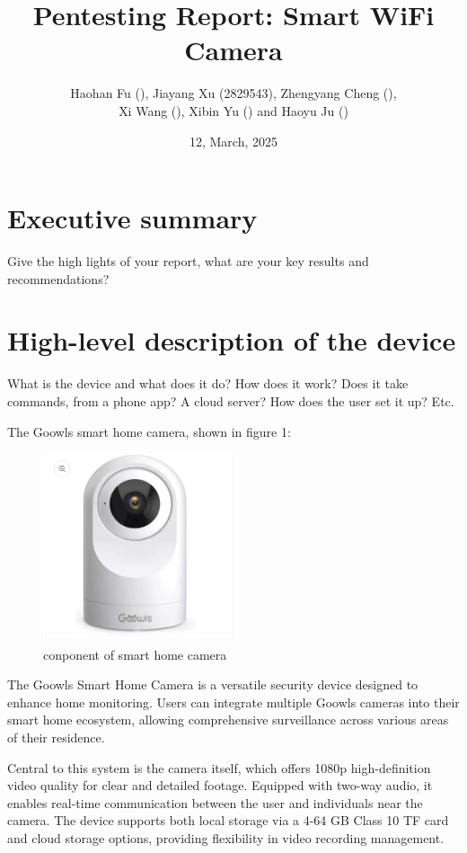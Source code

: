 \documentclass[11pt]{article}
\begin{document}
\title{Pentesting Report: Smart WiFi Camera}
\author{Haohan Fu (), Jiayang Xu (2829543), Zhengyang Cheng (),
    \\ Xi Wang (), Xibin Yu () and Haoyu Ju ()}
\date{12, March, 2025}
\maketitle

\section{Executive summary}

Give the high lights of your report, what are your key results and
recommendations?

\section{High-level description of the device}

What is the device and what does it do? How does it work? Does it take
commands, from a phone app? A cloud server? How does the user set it up? Etc.

The Goowls smart home camera, shown in figure 1:
\begin{figure}[htbp]
    \centering
    \includegraphics[width=0.5\textwidth]{imgs/camera.png}
    \caption{conponent of smart home camera}
\end{figure}

The Goowls Smart Home Camera is a versatile security device designed to enhance
home monitoring. Users can integrate multiple Goowls cameras into their smart
home ecosystem, allowing comprehensive surveillance across various areas of
their residence.

Central to this system is the camera itself, which offers 1080p high-definition
video quality for clear and detailed footage. Equipped with two-way audio, it
enables real-time communication between the user and individuals near the
camera. The device supports both local storage via a 4-64 GB Class 10 TF card
and cloud storage options, providing flexibility in video recording management.
\end{document}
